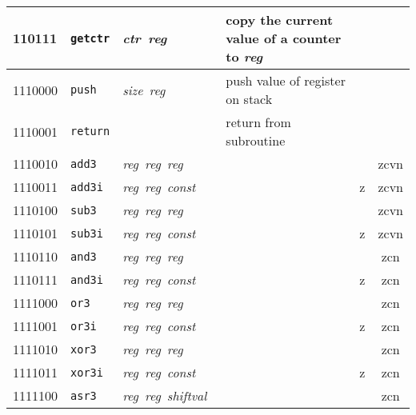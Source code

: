 \documentclass[architecture]{compas2018}
\newcommand{\reg}{\textit{reg}}
\newcommand{\const}{\textit{const}}
\newcommand{\shiftval}{\textit{shiftval}}
\newcommand{\ctr}{\textit{ctr}}
\newcommand{\size}{\textit{size}}
\begin{document}
\begin{table}[!h]
\begin{center}
\begin{tabular}{|l|l|l|l|l|c|}
    \hline
    110111  & \texttt{getctr} & \ctr\ \reg\                   & copy the current value of a counter to \reg\         &      &             \\
    \hline
    1110000 & \texttt{push}   & \size\ \reg\                  & push value of register on stack                      &      &             \\
    \hline
    1110001 & \texttt{return} &                               & return from subroutine                               &      &             \\
    \hline
    1110010 & \texttt{add3}   & \reg\ \reg\ \reg\             &                                                      &      & zcvn        \\
    \hline
    1110011 & \texttt{add3i}  & \reg\ \reg\ \const\           &                                                      & z    & zcvn        \\
    \hline
    1110100 & \texttt{sub3}   & \reg\ \reg\ \reg\             &                                                      &      & zcvn        \\
    \hline
    1110101 & \texttt{sub3i}  & \reg\ \reg\ \const\           &                                                      & z    & zcvn        \\
    \hline
    1110110 & \texttt{and3}   & \reg\  \reg\ \reg\            &                                                      &      & zcn         \\
    \hline
    1110111 & \texttt{and3i}  & \reg\ \reg\ \const\           &                                                      & {z}  & zcn         \\
    \hline
    1111000 & \texttt{or3}    & \reg\ \reg\ \reg\             &                                                      &      & zcn         \\
    \hline
    1111001 & \texttt{or3i}   & \reg\ \reg\ \const\           &                                                      & {z}  & zcn         \\
    \hline
    1111010 & \texttt{xor3}   & \reg\ \reg\ \reg\             &                                                      &      & zcn         \\
    \hline
    1111011 & \texttt{xor3i}  & \reg\ \reg\ \const\           &                                                      & {z}  & zcn         \\
    \hline
    1111100 & \texttt{asr3}   & \reg\  \reg\ \shiftval\       &                                                      &      & zcn         \\

\end{tabular}
\end{center}
\end{table}
\end{document}
